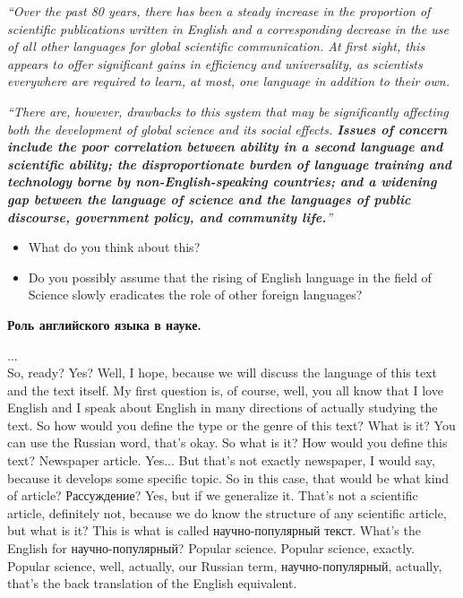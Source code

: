 \documentclass[main.tex]{subfiles}
\begin{document}
\textit{``Over the past 80 years, there has been a steady increase in the proportion of scientific publications written in English and a corresponding decrease in the use of all other languages for global scientific communication. At first sight, this appears to offer significant gains in efficiency and universality, as scientists everywhere are required to learn, at most, one language in addition to their own.}

\textit{``There are, however, drawbacks to this system that may be significantly affecting both the development of global science and its social effects. \textbf{Issues of concern include the poor correlation between ability in a second language and scientific ability; the disproportionate burden of language training and technology borne by non-English-speaking countries; and a widening gap between the language of science and the languages of public discourse, government policy, and community life.}''}
\begin{itemize}
	\item What do you think about this?
	\item Do you possibly assume that the rising of English language in the field of Science slowly eradicates the role of other foreign languages?
\end{itemize}

\textbf{Роль английского языка в науке.}

...
\\

So, ready?
Yes?
Well, I hope, because we will discuss the language of this text and the text itself.
My first question is, of course, well, you all know that I love English and I speak about English in many directions of actually studying the text.
So how would you define the type or the genre of this text?
What is it?
You can use the Russian word, that's okay.
So what is it?
How would you define this text?
Newspaper article.
Yes...
But that's not exactly newspaper, I would say, because it develops some specific topic.
So in this case, that would be what kind of article?
Рассуждение?
Yes, but if we generalize it.
That's not a scientific article, definitely not, because we do know the structure of any scientific article, but what is it?
This is what is called научно-популярный текст.
What's the English for научно-популярный?
Popular science.
Popular science, exactly.
Popular science, well, actually, our Russian term, научно-популярный, actually, that's the back translation of the English equivalent.
\end{document}

